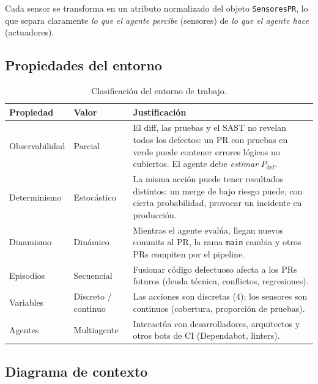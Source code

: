 \documentclass[11pt,a4paper]{article}
\newcommand{\Pdef}{P_{\text{def}}}
\begin{document}
Cada sensor se transforma en un atributo normalizado del objeto \texttt{SensoresPR}, lo que separa
claramente \emph{lo que el agente percibe} (sensores) de \emph{lo que el agente hace} (actuadores).

\subsection{Propiedades del entorno}

\begin{table}[H]
\centering
\caption{Clasificación del entorno de trabajo.}
\label{tab:entorno}
\begin{tabularx}{\textwidth}{@{}l l X@{}}
\toprule
\textbf{Propiedad} & \textbf{Valor} & \textbf{Justificación} \\
\midrule
Observabilidad & Parcial & El diff, las pruebas y el SAST no revelan todos los defectos: un PR con
pruebas en verde puede contener errores lógicos no cubiertos. El agente debe \emph{estimar}
$\Pdef$. \\
Determinismo & Estocástico & La misma acción puede tener resultados distintos: un merge de bajo riesgo
puede, con cierta probabilidad, provocar un incidente en producción. \\
Dinamismo & Dinámico & Mientras el agente evalúa, llegan nuevos commits al PR, la rama
\texttt{main} cambia y otros PRs compiten por el pipeline. \\
Episodios & Secuencial & Fusionar código defectuoso afecta a los PRs futuros (deuda técnica,
conflictos, regresiones). \\
Variables & Discreto / continuo & Las acciones son discretas (4); los sensores son continuos
(cobertura, proporción de pruebas). \\
Agentes & Multiagente & Interactúa con desarrolladores, arquitectos y otros bots de CI (Dependabot,
linters). \\
\bottomrule
\end{tabularx}
\end{table}

\subsection{Diagrama de contexto}
\end{document}
